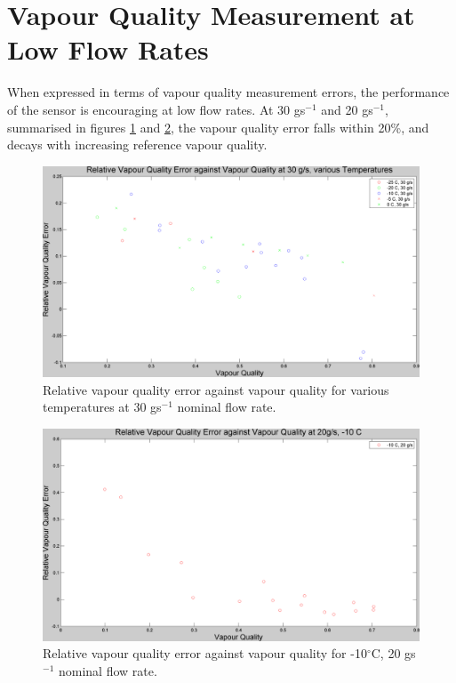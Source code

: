 \documentclass{report}
\begin{document}
\section{Vapour Quality Measurement at Low Flow Rates}
When expressed in terms of vapour quality measurement errors, the performance of the sensor is encouraging at low flow rates. At 30 gs$^{-1}$ and 20 gs$^{-1}$, summarised in figures \ref{plot:9} and \ref{plot:10}, the vapour quality error falls within 20\%, and decays with increasing reference vapour quality.
\begin{figure}
\includegraphics[width=\textwidth]{plots/fig9}
\caption{Relative vapour quality error against vapour quality for various temperatures at 30 gs$^{-1}$ nominal flow rate.}
\label{plot:9}
\end{figure}
\begin{figure}
\includegraphics[width=\textwidth]{plots/fig10}
\caption{Relative vapour quality error against vapour quality for -10$^\circ$C, 20 gs$^{-1}$ nominal flow rate.}
\label{plot:10}
\end{figure}
\FloatBarrier
{}
\end{document}
